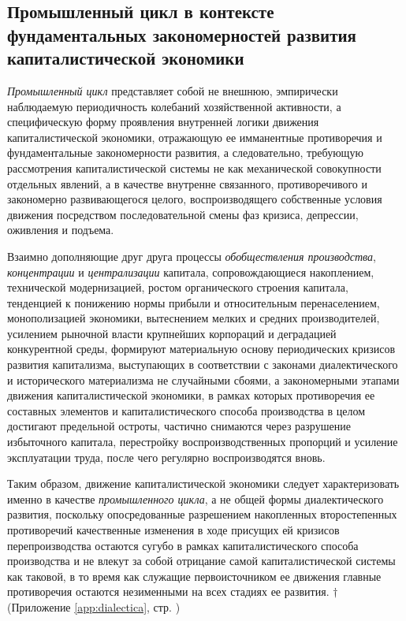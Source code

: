 \subsection{Промышленный цикл в контексте фундаментальных закономерностей развития капиталистической экономики}
\textit{Промышленный цикл} представляет собой не внешнюю, эмпирически наблюдаемую периодичность колебаний хозяйственной активности, а специфическую форму проявления внутренней логики движения капиталистической экономики, отражающую ее имманентные противоречия и фундаментальные закономерности развития, а следовательно, требующую рассмотрения капиталистической системы не как механической совокупности отдельных явлений, а в качестве внутренне связанного, противоречивого и закономерно развивающегося целого, воспроизводящего собственные условия движения посредством последовательной смены фаз кризиса, депрессии, оживления и подъема.

Взаимно дополняющие друг друга процессы \textit{обобществления производства}, \textit{концентрации} и \textit{централизации} капитала, сопровождающиеся накоплением, технической модернизацией, ростом органического строения капитала, тенденцией к понижению нормы прибыли и относительным перенаселением, монополизацией экономики, вытеснением мелких и средних производителей, усилением рыночной власти крупнейших корпораций и деградацией конкурентной среды, формируют материальную основу периодических кризисов развития капитализма, выступающих в соответствии с законами диалектического и исторического материализма не случайными сбоями, а закономерными этапами движения капиталистической экономики, в рамках которых противоречия ее составных элементов и капиталистического способа производства в целом достигают предельной остроты, частично снимаются через разрушение избыточного капитала, перестройку воспроизводственных пропорций и усиление эксплуатации труда, после чего регулярно воспроизводятся вновь.

Таким образом, движение капиталистической экономики следует характеризовать именно в качестве \textit{промышленного цикла}, а не общей формы диалектического развития, поскольку опосредованные разрешением накопленных второстепенных противоречий качественные изменения в ходе присущих ей кризисов перепроизводства остаются сугубо в рамках капиталистического способа производства и не влекут за собой отрицание самой капиталистической системы как таковой, в то время как служащие первоисточником ее движения главные противоречия остаются незименными на всех стадиях ее развития. $\dagger$ (Приложение \ref{app:dialectica}, стр. \pageref{app:dialectica})